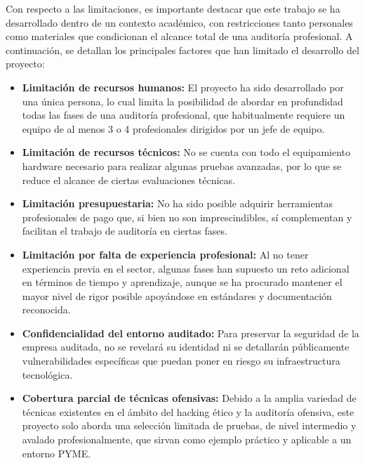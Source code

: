 \documentclass[a4paper, 11pt]{article}
\begin{document}
Con respecto a las limitaciones, es importante destacar que este trabajo se ha desarrollado dentro de un contexto académico, con restricciones tanto personales como materiales que condicionan el alcance total de una auditoría profesional. A continuación, se detallan los principales factores que han limitado el desarrollo del proyecto:

\begin{itemize}
    \item \textbf{Limitación de recursos humanos:} El proyecto ha sido desarrollado por una única persona, lo cual limita la posibilidad de abordar en profundidad todas las fases de una auditoría profesional, que habitualmente requiere un equipo de al menos 3 o 4 profesionales dirigidos por un jefe de equipo.

    \item \textbf{Limitación de recursos técnicos:} No se cuenta con todo el equipamiento hardware necesario para realizar algunas pruebas avanzadas, por lo que se reduce el alcance de ciertas evaluaciones técnicas.

    \item \textbf{Limitación presupuestaria:} No ha sido posible adquirir herramientas profesionales de pago que, si bien no son imprescindibles, sí complementan y facilitan el trabajo de auditoría en ciertas fases.


    \item \textbf{Limitación por falta de experiencia profesional:} Al no tener experiencia previa en el sector, algunas fases han supuesto un reto adicional en términos de tiempo y aprendizaje, aunque se ha procurado mantener el mayor nivel de rigor posible apoyándose en estándares y documentación reconocida.

    \item \textbf{Confidencialidad del entorno auditado:} Para preservar la seguridad de la empresa auditada, no se revelará su identidad ni se detallarán públicamente vulnerabilidades específicas que puedan poner en riesgo su infraestructura tecnológica.

    \item \textbf{Cobertura parcial de técnicas ofensivas:} Debido a la amplia variedad de técnicas existentes en el ámbito del hacking ético y la auditoría ofensiva, este proyecto solo aborda una selección limitada de pruebas, de nivel intermedio y avalado profesionalmente, que sirvan como ejemplo práctico y aplicable a un entorno PYME.
\end{itemize}
\par\vspace{0.5cm}
\end{document}
